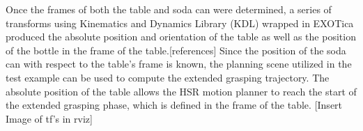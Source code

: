 \documentclass[12pt]{article}
\begin{document}
                \par Once the frames of both the table and soda can were determined, a series of transforms using Kinematics and Dynamics Library (KDL)\cite{noauthor_kinematics_nodate} wrapped in EXOTica produced the absolute position and orientation of the table as well as the position of the bottle in the frame of the table.[references] Since the position of the soda can with respect to the table's frame is known, the planning scene utilized in the test example can be used to compute the extended grasping trajectory.
                The absolute position of the table allows the HSR motion planner to reach the start of the extended grasping phase, which is defined in the frame of the table. [Insert Image of tf's in rviz]
\end{document}
